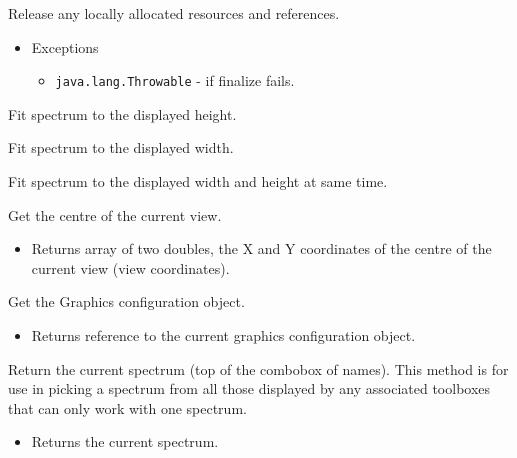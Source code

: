\begin{desc}Release any locally allocated resources and references.
\begin{itemize}
\item{{Exceptions}
  \begin{itemize}
   \item{\vspace{-.6ex}\texttt{java.lang.Throwable} - if finalize fails.}
  \end{itemize}
}
\end{itemize}
\end{desc}

\begin{desc}Fit spectrum to the displayed height.
\end{desc}

\begin{desc}Fit spectrum to the displayed width.
\end{desc}

\begin{desc}Fit spectrum to the displayed width and height at same time.
\end{desc}

\begin{desc}Get the centre of the current view.
\begin{itemize}
\item{Returns array of two doubles, the X and Y coordinates of the
 centre of the current view (view coordinates). }
\end{itemize}
\end{desc}

\begin{desc}Get the Graphics configuration object.
\begin{itemize}
\item{Returns reference to the current graphics configuration object. }
\end{itemize}
\end{desc}

\begin{desc}Return the current spectrum (top of the combobox of names).
 This method is for use in picking a spectrum from all those
 displayed by any associated toolboxes that can only work with
 one spectrum.
\begin{itemize}
\item{Returns the current spectrum. }
\end{itemize}
\end{desc}

